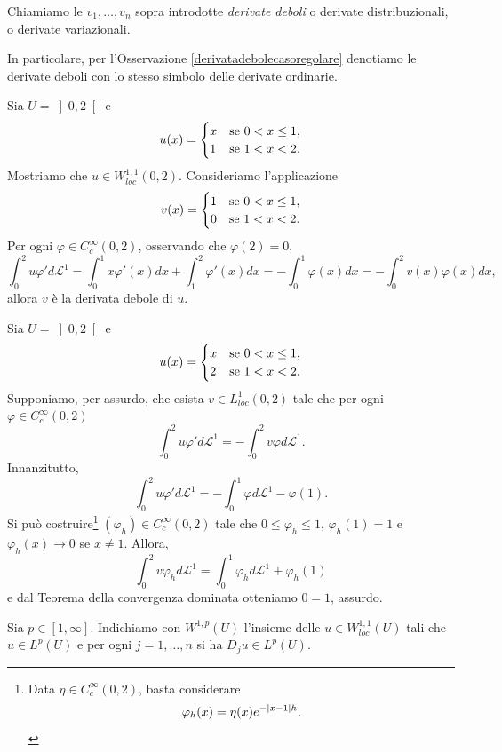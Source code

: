 \begin{definizione}
	Chiamiamo le $v_{1},\dots,v_{n}$ sopra introdotte \emph{derivate deboli} o derivate distribuzionali, o derivate variazionali.
\end{definizione}
In particolare, per l'Osservazione \eqref{derivatadebolecasoregolare} denotiamo le derivate deboli con lo stesso simbolo delle derivate ordinarie.
\begin{esempio}
	Sia $U = \left] 0,2\right[ $ e 
	\[ u(x) = \begin{cases}
		x & \textup{se } 0 < x \leq 1, \\
		1 & \textup{se } 1 < x < 2.
	\end{cases} \]
	Mostriamo che $u \in W^{1,1}_{loc}(0,2)$. Consideriamo l'applicazione
	\[ v(x) = \begin{cases}
		1 & \textup{se } 0 < x \le 1, \\
		0 & \textup{se } 1 < x < 2.
	\end{cases} \]
	Per ogni $\varphi \in C^{\infty}_{c}(0,2)$, osservando che $\varphi(2) = 0 $,
	\[ \int_{0}^{2} u \varphi' d\mathcal{L}^1 = \int_{0}^{1}x\varphi'(x)dx + \int_{1}^{2}\varphi'(x)dx = - \int_{0}^{1}\varphi(x)dx = - \int_{0}^{2}v(x)\varphi(x)dx,  \]
	allora $v$ è la derivata debole di $u$.
\end{esempio}
\begin{esempio}
	Sia $U = \left] 0,2\right[ $ e
	\[ u(x) = \begin{cases}
		x & \textup{se } 0 < x \leq 1, \\
		2 & \textup{se } 1 < x < 2.
	\end{cases} \]
	Supponiamo, per assurdo, che esista $v \in L^1_{loc}(0,2)$ tale che per ogni $\varphi \in C^{\infty}_{c}(0,2)$
	\[ \int_{0}^{2}u\varphi'd\mathcal{L}^1 = - \int_{0}^{2}v\varphi d\mathcal{L}^1. \]
	Innanzitutto,
	\[ \int_{0}^{2}u\varphi'd\mathcal{L}^1 = -\int_{0}^{1}\varphi d\mathcal{L}^1 - \varphi(1). \]
	Si può costruire\footnote{Data $\eta \in C^{\infty}_{c}(0,2)$, basta considerare
		\[ \varphi_h(x) = \eta(x)e^{-\lvert x-1\rvert h}. \]} $(\varphi_h) \in C^{\infty}_{c}(0,2)$ tale che $0 \le \varphi_h \le 1$, $\varphi_h(1) = 1$ e $\varphi_h(x) \to 0$ se $x \ne 1$. Allora,
	\[ \int_{0}^{2}v\varphi_h d\mathcal{L}^1 = \int_{0}^{1}\varphi_hd\mathcal{L}^1 + \varphi_h(1)\]
	e dal Teorema della convergenza dominata otteniamo $0=1$, assurdo.
\end{esempio}
\begin{notazione}
	Sia $p \in \left[ 1,\infty\right] $. Indichiamo con  $W^{1,p}(U)$ l'insieme delle $u \in W^{1,1}_{loc}(U)$ tali che $u \in L^p(U)$ e per ogni $j = 1,\dots,n$ si ha $D_{j}u \in L^p(U)$.
\end{notazione}

